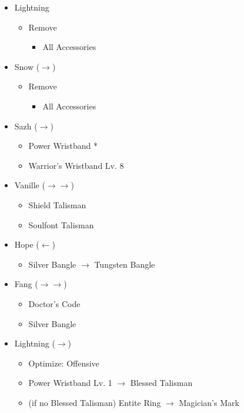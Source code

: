 	\begin{menu}
		\begin{itemize}
			\equip
			\begin{itemize}
				\item Lightning
				      \begin{itemize}
					      \item Remove
					            \begin{itemize}
						            \item All Accessories
					            \end{itemize}
				      \end{itemize}
				\item Snow ($\rightarrow$)
				      \begin{itemize}
					      \item Remove
					            \begin{itemize}
						            \item All Accessories
					            \end{itemize}
				      \end{itemize}
				\item Sazh ($\rightarrow$)
				      \begin{itemize}
					      \item Power Wristband *
					      \item Warrior's Wristband Lv. 8
				      \end{itemize}
				\item Vanille ($\rightarrow\rightarrow$)
				      \begin{itemize}
					      \item Shield Talisman
					      \item Soulfont Talisman
				      \end{itemize}
				\item Hope ($\leftarrow$)
				      \begin{itemize}
					      \item Silver Bangle $\rightarrow$ Tungsten Bangle
				      \end{itemize}
				\item Fang ($\rightarrow\rightarrow$)
				      \begin{itemize}
					      \item Doctor's Code
					      \item Silver Bangle
				      \end{itemize}
				\item Lightning ($\rightarrow$)
				      \begin{itemize}
					      \item Optimize: Offensive
					      \item Power Wristband Lv. 1 $\rightarrow$ Blessed Talisman
					      \item (if no Blessed Talisman) Entite Ring $\rightarrow$ Magician's Mark
				      \end{itemize}
			\end{itemize}
		\end{itemize}
	\end{menu}
